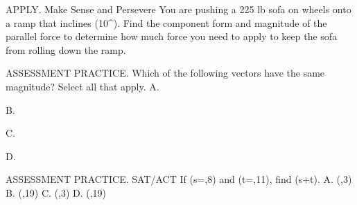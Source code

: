 \documentclass{article}
\newenvironment{practice}[2]{}{}        %
\newcommand{\answer}[1]{}               %
\newcommand{\placeholder}[2]{}          %
\begin{document}
\begin{practice}{34}{2}
APPLY. Make Sense and Persevere You are pushing a 225 lb sofa on wheels onto a ramp that inclines (10^\circ). Find the component form and magnitude of the parallel force to determine how much force you need to apply to keep the sofa from rolling down the ramp.
\placeholder{illustration}{Person pushes a purple sofa up a brown ramp into a moving truck. Ramp rises rightward at 10 degrees. Force diagram through sofa has vertical downward arrow, an arrow perpendicular down-right to the ramp, and an arrow parallel down-left to the ramp, with dashed component segments and a right-angle marker. The 10-degree label is near the angle between the vertical and the perpendicular direction below the sofa.}
\answer{magnitude 39.1 lb; (\langle38.5,6.8\rangle)}
\end{practice}
\begin{practice}{35}{1}
ASSESSMENT PRACTICE. Which of the following vectors have the same magnitude? Select all that apply.
A.
\placeholder{graph}{Choice A: square unit coordinate grid, x and y axes with arrows both ends, origin O, labeled ticks x=-2,2,4 and y=-2,2, window approximately x=-3 to 5 and y=-4 to 4. Red vector from labeled (4,1) to labeled (-2,-3), arrowhead at (-2,-3).}
B.
\placeholder{graph}{Choice B: same unit-grid axes and window as A. Red vector from closed point (2,3) to (4,1), both coordinates labeled; arrowhead at (4,1).}
C.
\placeholder{graph}{Choice C: same unit-grid axes and window as A. Red vector from closed point (-2,2) to (4,1), both coordinates labeled; arrowhead at (4,1).}
D.
\placeholder{graph}{Choice D: same unit-grid axes and window as A. Red vector from closed point (4,1) to (2,3), both coordinates labeled; arrowhead at (2,3).}
\answer{B, D}
\end{practice}
\begin{practice}{36}{1}
ASSESSMENT PRACTICE. SAT/ACT If (\vec s=,8\rangle) and (\vec t=,11\rangle), find (\vec s+\vec t).
A. (,3\rangle)
B. (,19\rangle)
C. (,3\rangle)
D. (,19\rangle)
\answer{D}
\end{practice}
\end{document}
